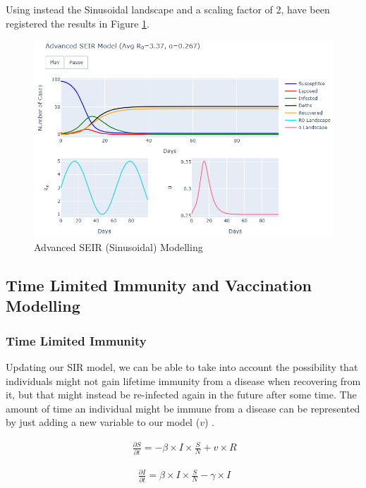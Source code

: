 Using instead the Sinusoidal landscape and a scaling factor of 2, have been registered the results in Figure \ref{sine_seir}.

\begin{figure}[ht!]%
    \centering
    \includegraphics[width=13cm]{latex/images/sine_seir.PNG}%
    \caption{Advanced SEIR (Sinusoidal) Modelling}
    \label{sine_seir}
\end{figure}

\subsection{Time Limited Immunity and Vaccination Modelling}

\subsubsection{Time Limited Immunity}

Updating our SIR model, we can be able to take into account the possibility that individuals might not gain lifetime immunity from a disease when recovering from it, but that might instead be re-infected again in the future after some time. The amount of time an individual might be immune from a disease can be represented by just adding a new variable to our model ($v$) \cite{immune}.

\useshortskip
\begin{align}
\ \frac{\partial S}{\partial t} = -\beta \times I \times \frac{S}{N} + v \times R
\end{align}
\useshortskip

\useshortskip
\begin{align}
\ \frac{\partial I}{\partial t} = \beta \times I \times \frac{S}{N} -\gamma \times I
\end{align}
\useshortskip

